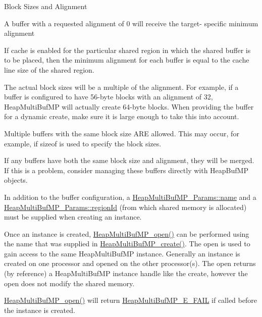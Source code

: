Block Sizes and Alignment
\begin{DoxyItemize}
\item A buffer with a requested alignment of 0 will receive the target-\/ specific minimum alignment
\item If cache is enabled for the particular shared region in which the shared buffer is to be placed, then the minimum alignment for each buffer is equal to the cache line size of the shared region.
\item The actual block sizes will be a multiple of the alignment. For example, if a buffer is configured to have 56-\/byte blocks with an alignment of 32, Heap\-Multi\-Buf\-M\-P will actually create 64-\/byte blocks. When providing the buffer for a dynamic create, make sure it is large enough to take this into account.
\item Multiple buffers with the same block size A\-R\-E allowed. This may occur, for example, if sizeof is used to specify the block sizes.
\item If any buffers have both the same block size and alignment, they will be merged. If this is a problem, consider managing these buffers directly with Heap\-Buf\-M\-P objects.
\end{DoxyItemize}

In addition to the buffer configuration, a \hyperlink{struct_heap_multi_buf_m_p___params_ac7a5994ab0dd02e88d3ad16e23b1a548}{Heap\-Multi\-Buf\-M\-P\-\_\-\-Params\-::name} and a \hyperlink{struct_heap_multi_buf_m_p___params_aa3c641a64db9b4ff0c93f9a0c265f8d7}{Heap\-Multi\-Buf\-M\-P\-\_\-\-Params\-::region\-Id} (from which shared memory is allocated) must be supplied when creating an instance.

Once an instance is created, \hyperlink{_heap_multi_buf_m_p_8h_a0fe88a611f390024e0772876546084cc}{Heap\-Multi\-Buf\-M\-P\-\_\-open()} can be performed using the name that was supplied in \hyperlink{_heap_multi_buf_m_p_8h_a76b4a6dc8007ad99b598aa5a64b0d955}{Heap\-Multi\-Buf\-M\-P\-\_\-create()}. The open is used to gain access to the same Heap\-Multi\-Buf\-M\-P instance. Generally an instance is created on one processor and opened on the other processor(s). The open returns (by reference) a Heap\-Multi\-Buf\-M\-P instance handle like the create, however the open does not modify the shared memory.

\hyperlink{_heap_multi_buf_m_p_8h_a0fe88a611f390024e0772876546084cc}{Heap\-Multi\-Buf\-M\-P\-\_\-open()} will return \hyperlink{_heap_multi_buf_m_p_8h_aa539c8b8eaab1a246208b00d3cb95d89}{Heap\-Multi\-Buf\-M\-P\-\_\-\-E\-\_\-\-F\-A\-I\-L} if called before the instance is created.

